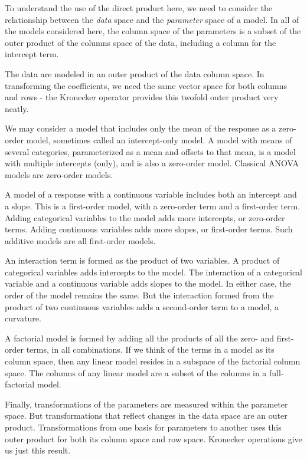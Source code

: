 \documentclass[]{article}
\begin{document}
To understand the use of the direct product here, we need to consider
the relationship between the \emph{data} space and the \emph{parameter}
space of a model. In all of the models considered here, the column space
of the parameters is a subset of the outer product of the columns space
of the data, including a column for the intercept term.

The data are modeled in an outer product of the data column space. In
transforming the coefficients, we need the same vector space for both
columns and rows - the Kronecker operator provides this twofold outer
product very neatly.

We may consider a model that includes only the mean of the response as a
zero-order model, sometimes called an intercept-only model. A model with
means of several categories, parameterized as a mean and offsets to that
mean, is a model with multiple intercepts (only), and is also a
zero-order model. Classical ANOVA models are zero-order models.

A model of a response with a continuous variable includes both an
intercept and a slope. This is a first-order model, with a zero-order
term and a first-order term. Adding categorical variables to the model
adds more intercepts, or zero-order terms. Adding continuous variables
adds more slopes, or first-order terms. Such additive models are all
first-order models.

An interaction term is formed as the product of two variables. A product
of categorical variables adds intercepts to the model. The interaction
of a categorical variable and a continuous variable adds slopes to the
model. In either case, the order of the model remains the same. But the
interaction formed from the product of two continuous variables adds a
second-order term to a model, a curvature.

A factorial model is formed by adding all the products of all the zero-
and first-order terms, in all combinations. If we think of the terms in
a model as its column space, then any linear model resides in a subspace
of the factorial column space. The columns of any linear model are a
subset of the columns in a full-factorial model.

Finally, transformations of the parameters are measured within the
parameter space. But transformations that reflect changes in the data
space are an outer product. Transformations from one basis for
parameters to another uses this outer product for both its column space
and row space. Kronecker operations give us just this result.
\end{document}
